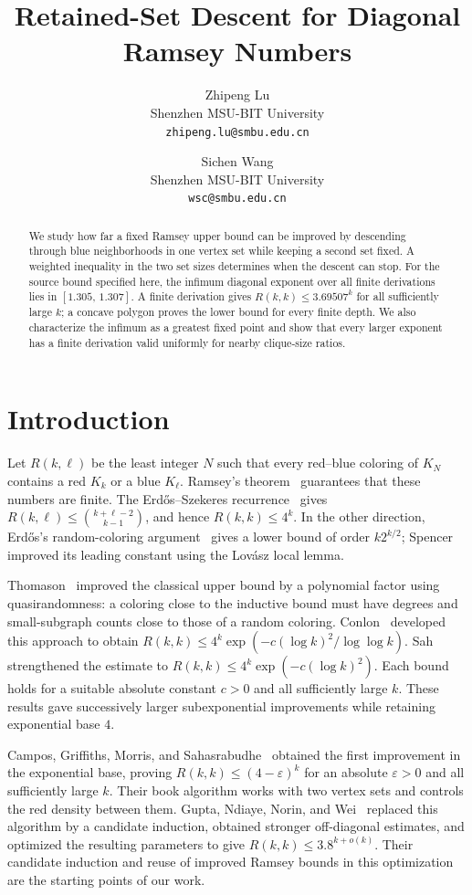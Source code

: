 \documentclass[11pt]{article}
\title{Retained-Set Descent for Diagonal Ramsey Numbers}
\author{Zhipeng Lu\\
  \small Shenzhen MSU-BIT University\\
  \small\texttt{zhipeng.lu@smbu.edu.cn}
  \and
  Sichen Wang\\
  \small Shenzhen MSU-BIT University\\
  \small\texttt{wsc@smbu.edu.cn}}
\date{}
\theoremstyle{definition}
\begin{document}
\maketitle
\begin{abstract}
We study how far a fixed Ramsey upper bound can be improved by descending through blue neighborhoods in one vertex set while keeping a second set fixed.
A weighted inequality in the two set sizes determines when the descent can stop.
For the source bound specified here, the infimum diagonal exponent over all finite derivations lies in $[1.305,\,1.307]$.
A finite derivation gives $R(k,k)\le3.69507^k$ for all sufficiently large $k$; a concave polygon proves the lower bound for every finite depth.
We also characterize the infimum as a greatest fixed point and show that every larger exponent has a finite derivation valid uniformly for nearby clique-size ratios.
\end{abstract}

\section{Introduction}
Let $R(k,\ell)$ be the least integer $N$ such that every red--blue coloring of $K_N$ contains a red $K_k$ or a blue $K_\ell$.
Ramsey's theorem~\cite{Ramsey} guarantees that these numbers are finite.
The Erd\H{o}s--Szekeres recurrence~\cite{ES} gives $R(k,\ell)\le\binom{k+\ell-2}{k-1}$, and hence $R(k,k)\le4^k$.
In the other direction, Erd\H{o}s's random-coloring argument~\cite{Erdos} gives a lower bound of order $k2^{k/2}$; Spencer~\cite{Spencer} improved its leading constant using the Lov\'asz local lemma.

Thomason~\cite{Thomason} improved the classical upper bound by a polynomial factor using quasirandomness: a coloring close to the inductive bound must have degrees and small-subgraph counts close to those of a random coloring.
Conlon~\cite{Conlon} developed this approach to obtain $R(k,k)\le4^k\exp(-c(\log k)^2/\log\log k)$.
Sah~\cite{Sah} strengthened the estimate to $R(k,k)\le4^k\exp(-c(\log k)^2)$.
Each bound holds for a suitable absolute constant $c>0$ and all sufficiently large $k$.
These results gave successively larger subexponential improvements while retaining exponential base $4$.

Campos, Griffiths, Morris, and Sahasrabudhe~\cite{CGMS} obtained the first improvement in the exponential base, proving $R(k,k)\le(4-\varepsilon)^k$ for an absolute $\varepsilon>0$ and all sufficiently large $k$.
Their book algorithm works with two vertex sets and controls the red density between them.
Gupta, Ndiaye, Norin, and Wei~\cite{GNNW} replaced this algorithm by a candidate induction, obtained stronger off-diagonal estimates, and optimized the resulting parameters to give $R(k,k)\le3.8^{k+o(k)}$.
Their candidate induction and reuse of improved Ramsey bounds in this optimization are the starting points of our work.
\end{document}
